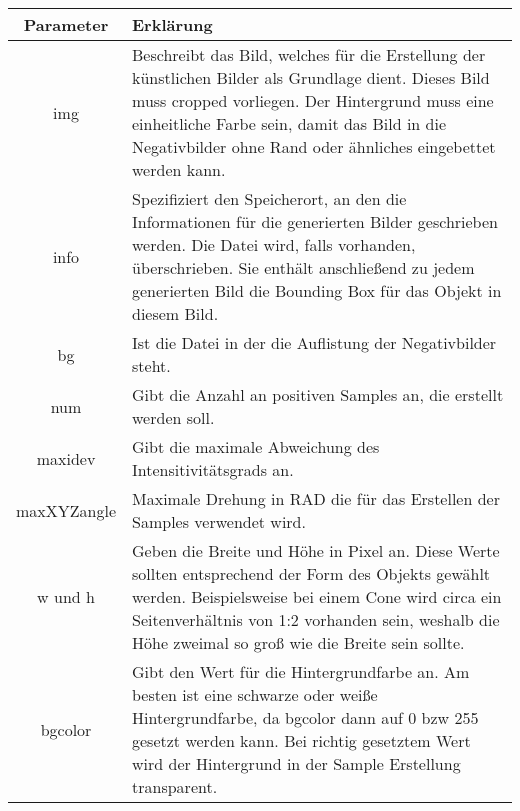\begin{table}[H]
\begin{tabularx}{\textwidth}{|c|X|}
\hline
Parameter & Erklärung \\ \hline
img & Beschreibt das Bild, welches für die Erstellung der künstlichen Bilder als Grundlage dient. Dieses Bild muss cropped vorliegen. Der Hintergrund muss eine einheitliche Farbe sein, damit das Bild in die Negativbilder ohne Rand oder ähnliches eingebettet werden kann.\\ \hline
info & Spezifiziert den Speicherort, an den die Informationen für die generierten Bilder geschrieben werden. Die Datei wird, falls vorhanden, überschrieben. Sie enthält anschließend zu jedem generierten Bild die Bounding Box für das Objekt in diesem Bild.\\ \hline
bg & Ist die Datei in der die Auflistung der Negativbilder steht.\\ \hline
num & Gibt die Anzahl an positiven Samples an, die erstellt werden soll.\\ \hline
maxidev & Gibt die maximale Abweichung des Intensitivitätsgrads an.\\ \hline
maxXYZangle & Maximale Drehung in RAD die für das Erstellen der Samples verwendet wird.\\ \hline
w und h & Geben die Breite und Höhe in Pixel an. Diese Werte sollten entsprechend der Form des Objekts gewählt werden. Beispielsweise bei einem Cone wird circa ein Seitenverhältnis von 1:2 vorhanden sein, weshalb die Höhe zweimal so groß wie die Breite sein sollte.\\ \hline
bgcolor & Gibt den Wert für die Hintergrundfarbe an. Am besten ist eine schwarze oder weiße Hintergrundfarbe, da bgcolor dann auf 0 bzw 255 gesetzt werden kann. Bei richtig gesetztem Wert wird der Hintergrund in der Sample Erstellung transparent.\\ \hline
\end{tabularx}
\end{table}

